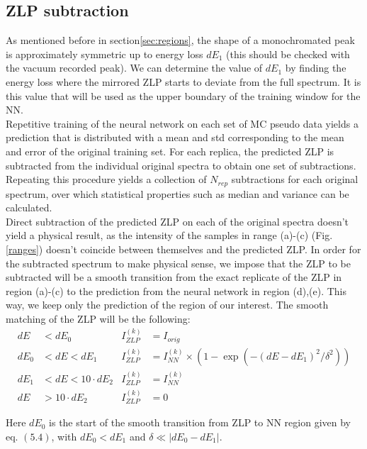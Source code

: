 \documentclass[11pt,a4paper]{article}
\numberwithin{equation}{section}
\numberwithin{figure}{section}
\numberwithin{table}{section}
\begin{document}
\subsection{ZLP subtraction}\label{sec:subtraction}

As mentioned before in section\ref{sec:regions}, the shape of a monochromated peak is approximately symmetric up to energy loss $dE_1$ (this should be checked with the vacuum recorded peak). We can determine the value of $dE_1$ by finding the energy loss where the mirrored ZLP starts to deviate from the full spectrum. It is this value that will be used as the upper boundary of the training window for the NN. \\

Repetitive training of the neural network on each set of MC pseudo data yields a prediction that is distributed with a mean and std corresponding to the mean and error of the original training set. For each replica, the predicted ZLP is subtracted from the individual original spectra to obtain one set of subtractions. Repeating this procedure yields a collection of $N_{rep}$ subtractions for each original spectrum, over which statistical properties such as median and variance can be calculated. \\

Direct subtraction of the predicted ZLP on each of the original spectra doesn't yield a physical result, as the intensity of the samples in range (a)-(c) (Fig. \ref{ranges}) doesn't coincide between themselves and the predicted ZLP. In order for the subtracted spectrum to make physical sense, we impose that the ZLP to be subtracted will be a smooth transition from the exact replicate of the ZLP in region (a)-(c) to the prediction from the neural network in region (d),(e). This way, we keep only the prediction of the region of our interest. The smooth matching of the ZLP will be the following:
\begin{align}
 dE &< dE_0          &   I_{ZLP}^{(k)} &= I_{orig}\\
 dE_0 &< dE < dE_1   &  I_{ZLP}^{(k)} &= I_{NN}^{(k)} \times  \left( 1 - \exp(-(dE - dE_1)^2/\delta^2)\right) \\
 dE_1 &< dE < 10 \cdot dE_2 &  I_{ZLP}^{(k)} &= I_{NN}^{(k)}\\
 dE &> 10 \cdot dE_2 &   I_{ZLP}^{(k)} &= 0
\end{align}

Here $dE_0$ is the start of the smooth transition from ZLP to NN region given by eq. $(5.4)$, with $dE_0<dE_1$  and $\delta \ll |dE_0 - dE_1|$. 
\end{document}
